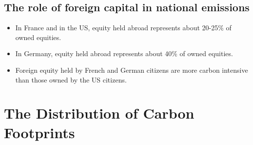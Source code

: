 \documentclass{beamer}
\begin{document}
\subsection{The role of foreign capital in national emissions}
\begin{frame}{\subsecname}
    \begin{itemize}
        \item In France and in the US, equity held abroad represents about 20-25\% of owned equities.
        \item In Germany, equity held abroad represents about 40\% of owned equities.
        \item Foreign equity held by French and German citizens are more carbon intensive than those owned by the US citizens.
    \end{itemize}
\end{frame}

\section{The Distribution of Carbon Footprints}
\begin{frame}{\secname}
    \tableofcontents[currentsection, hideothersubsections, sections=\value{section}]
\end{frame}
\end{document}
